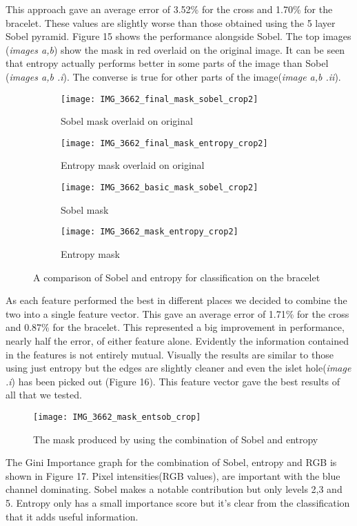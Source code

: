 \documentclass[12pt]{IIBproject}
\begin{document}
This approach gave an average error of 3.52\% for the cross and 1.70\% for the bracelet. These values are slightly worse than those obtained using the 5 layer Sobel pyramid. Figure 15 shows the performance alongside Sobel. The top images (\emph{images a,b}) show the mask in red overlaid on the original image. It can be seen that entropy actually performs better in some parts of the image than Sobel (\emph{images a,b .i}). The converse is true for other parts of the image(\emph{image a,b .ii}). 
\begin{figure}[H]
\centering

\begin{subfigure}{.45\textwidth}
  \centering
  \texttt{[image: IMG\_3662\_final\_mask\_sobel\_crop2]}
  \caption{Sobel mask overlaid on original}
  \label{fig:sub1}
\end{subfigure}%
\begin{subfigure}{.45\textwidth}
  \centering
  \texttt{[image: IMG\_3662\_final\_mask\_entropy\_crop2]}
  \caption{Entropy mask overlaid on original}
  \label{fig:sub2}
\end{subfigure}
\begin{subfigure}{.45\textwidth}
  \centering
  \texttt{[image: IMG\_3662\_basic\_mask\_sobel\_crop2]}
  \caption{Sobel mask}
  \label{fig:sub2}
\end{subfigure}
\begin{subfigure}{.45\textwidth}
  \centering
  \texttt{[image: IMG\_3662\_mask\_entropy\_crop2]}
  \caption{Entropy mask}
  \label{fig:sub2}
\end{subfigure}


\caption{A comparison of Sobel and entropy for classification on the bracelet}
\label{fig:test}
\end{figure}
As each feature performed the best in different places we decided to combine the two into a single feature vector. This gave an average error of 1.71\% for the cross and 0.87\% for the bracelet. This represented a big improvement in performance, nearly half the error, of either feature alone. Evidently the information contained in the features is not entirely mutual. Visually the results are similar to those using just entropy but the edges are slightly cleaner and even the islet hole(\emph{image .i}) has been picked out (Figure 16). This feature vector gave the best results of all that we tested.

\begin{figure}[H]
  
  \centering
    \texttt{[image: IMG\_3662\_mask\_entsob\_crop]}
    \caption{The mask produced by using the combination of Sobel and entropy}
\end{figure}
The Gini Importance graph for the combination of Sobel, entropy and RGB is shown in Figure 17. Pixel intensities(RGB values), are important with the blue channel dominating. Sobel makes a notable contribution but only levels 2,3 and 5. Entropy only has a small importance score but it's clear from the classification that it adds useful information.
\end{document}

